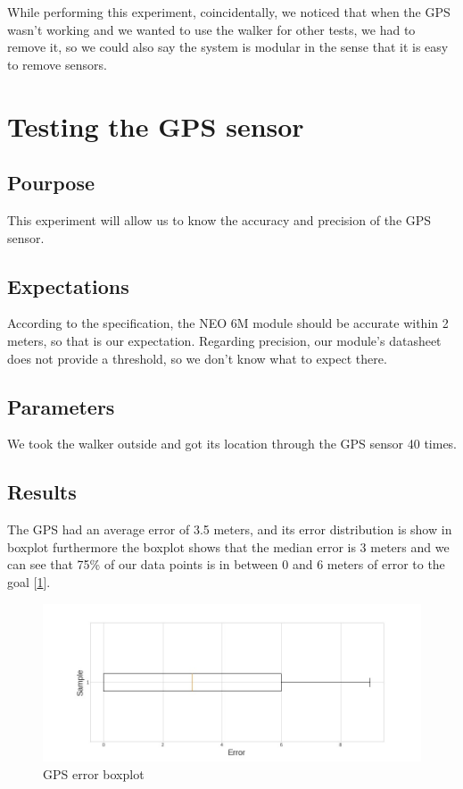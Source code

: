 	While performing this experiment, coincidentally, we noticed that when the GPS wasn't working and we wanted to use the walker for other tests, we had to remove it, so we could also say the system is modular in the sense that it is easy to remove sensors.

\section{Testing the GPS sensor}

	\subsection*{Pourpose}
		This experiment will allow us to know the accuracy and precision of the GPS sensor.
	\subsection*{Expectations}
		According to the specification, the NEO 6M module should be accurate within 2 meters, so that is our expectation. Regarding precision, our module's datasheet does not provide a threshold, so we don't know what to expect there.

	\subsection*{Parameters}
		We took the walker outside and got its location through the GPS sensor 40 times.

	\subsection*{Results}
		The GPS had an average error of 3.5 meters, and its error distribution is show in boxplot furthermore the boxplot shows that the median error is 3 meters and  we can see that 75\% of our data points is in between 0 and 6 meters of error to the goal [\ref{fig:gps_plot}].

		\begin{figure}[h!]
			\centering
			\includegraphics[width=1.1\linewidth]{gfx/gps_boxplot_error}
			\caption{GPS error boxplot}
			\label{fig:gps_plot}
		\end{figure}

